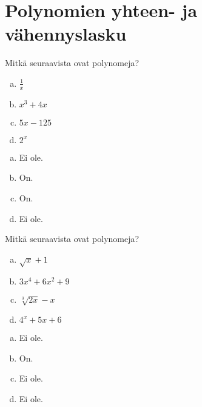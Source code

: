 \section{Polynomien yhteen- ja vähennyslasku}



\Harjoitustehtavat

\begin{tehtava}
    Mitkä seuraavista ovat polynomeja?
    \begin{enumerate}[a)]
        \item $\frac{1}{x}$
        \item $x^3+4x$
        \item $5x-125$
        \item $2^x$
    \end{enumerate}
    \begin{vastaus}
        \begin{enumerate}[a)]
            \item Ei ole.
            \item On.
            \item On.
            \item Ei ole.
        \end{enumerate}
     \end{vastaus}
\end{tehtava}

\begin{tehtava}
    Mitkä seuraavista ovat polynomeja?
    \begin{enumerate}[a)]
        \item $\sqrt{x}+1$
        \item $3x^4+6x^2+9$
        \item $\sqrt[3]{2x}-x$
        \item $4^x+5x+6$
    \end{enumerate}
    \begin{vastaus}
        \begin{enumerate}[a)]
            \item Ei ole.
            \item On.
            \item Ei ole.
            \item Ei ole.
        \end{enumerate}
    \end{vastaus}
\end{tehtava}

